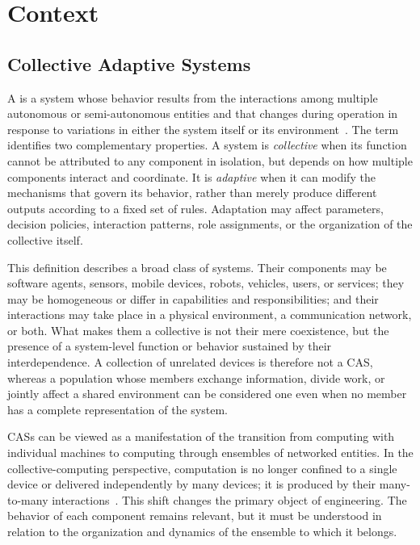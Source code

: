 
\chapter{Context}
\label{chap:context}
\minitoc

\section{Collective Adaptive Systems}

A  is a system whose behavior results
 from the interactions among multiple autonomous or semi-autonomous entities 
 and that changes during operation in response to variations in either the system itself 
 or its environment~\cite{DBLP:conf/huc/Ferscha15}. 
% 
The term identifies two complementary properties. 
%
A system is \emph{collective} when its function cannot be attributed to any component in isolation, 
 but depends on how multiple components interact and coordinate. 
% 
It is \emph{adaptive} when it can modify the mechanisms that govern its behavior, 
 rather than merely produce different outputs according to a fixed set of rules. 
% 
Adaptation may affect parameters, decision policies, interaction patterns, role assignments, 
 or the organization of the collective itself.

This definition describes a broad class of systems. 
%
Their components may be software agents, sensors, mobile devices, robots, vehicles, users, or services;
 they may be homogeneous or differ in capabilities and responsibilities; 
 and their interactions may take place in a physical environment, a communication network, or both. 
%
What makes them a collective is not their mere coexistence,
 but the presence of a system-level function or behavior sustained by their interdependence. 
% 
A collection of unrelated devices is therefore not a CAS,
 whereas a population whose members exchange information, divide work, 
 or jointly affect a shared environment can be considered one even when 
 no member has a complete representation of the system.

\glspl{CAS} can be viewed as a manifestation of the transition from computing 
 with individual machines to computing through ensembles of networked entities. 
%
In the collective-computing perspective, 
 computation is no longer confined to a single device or delivered independently by many devices; 
 it is produced by their many-to-many interactions~\cite{DBLP:journals/computer/Abowd}. 
% 
This shift changes the primary object of engineering. 
%
The behavior of each component remains relevant, but it must be understood in relation
 to the organization and dynamics of the ensemble to which it belongs.

